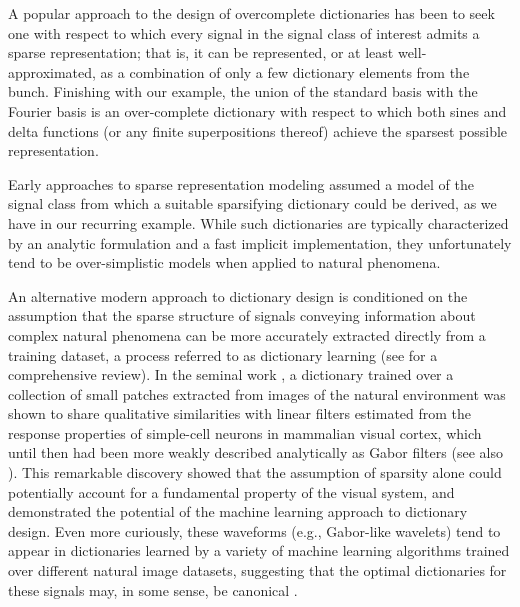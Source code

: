 A popular approach to the design of overcomplete dictionaries has been to seek one with respect to which every signal in the signal class of interest admits a sparse representation; that is, it can be represented, or at least well-approximated, as a combination of only a few dictionary elements from the bunch. Finishing with our example, the union of the standard basis with the Fourier basis is an over-complete dictionary with respect to which both sines and delta functions (or any finite superpositions thereof) achieve the sparsest possible representation.

Early approaches to sparse representation modeling assumed a model of the signal class from which a suitable sparsifying dictionary could be derived, as we have in our recurring example. While such dictionaries are typically characterized by an analytic formulation and a fast implicit implementation, they unfortunately tend to be over-simplistic models when applied to natural phenomena. 

An alternative modern approach to dictionary design is conditioned on the assumption that the sparse structure of signals conveying information about complex natural phenomena can be more accurately extracted directly from a training dataset, a process referred to as dictionary learning  (see \cite{Zhang15} for a comprehensive review). In the seminal work \cite{Olshausen96}, a dictionary trained over a collection of small patches extracted from images of the natural environment was shown to share qualitative similarities with linear filters estimated from the response properties of simple-cell neurons in mammalian visual cortex, which until then had been more weakly described analytically as Gabor filters (see also \cite{hurri1996image, bell1997independent, van1998independent}). This remarkable discovery showed that the assumption of sparsity alone could potentially account for a fundamental property of the visual system, and demonstrated the potential of the machine learning approach to dictionary design. Even more curiously, these waveforms (e.g., Gabor-like wavelets) tend to appear in dictionaries learned by a variety of machine learning algorithms trained over different natural image datasets, suggesting that the optimal dictionaries for these signals may, in some sense, be canonical \cite{donoho2001can}.


